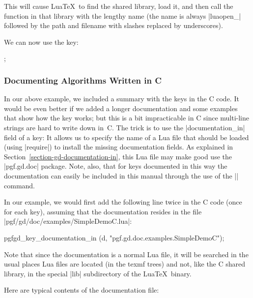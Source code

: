This will cause Lua\TeX\ to find the shared library, load it, and then
call the function in that library with the lengthy name (the name is
always |luaopen_| followed by the path and filename with slashes
replaced by underscores). 

We can now use the key:

\begin{codeexample}[]
\tikz {};
\end{codeexample}

\subsubsection{Documenting Algorithms Written in C}
\label{section-gd-documenting-c-algos}


In our above example, we included a summary with the keys in the C
code. It would be even better if we added a longer documentation and
some examples that show how the key works; but this is a bit
impracticable in C since multi-line strings are hard to write down
in~C. The trick is to use the |documentation_in| field of a key: It
allows us to specify the name of a Lua file that should be loaded
(using |require|) to install the missing documentation fields. As
explained in Section~\ref{section-gd-documentation-in}, this Lua file
may make good use the |pgf.gd.doc| package. Note, also, that for keys
documented in this way the documentation can easily be included in
this manual through the use of the || command.

In our example, we would first add the following line twice in the
C code (once for each key), assuming that the documentation resides in
the file |pgf/gd/doc/examples/SimpleDemoC.lua|:

\begin{codeexample}
  pgfgd_key_documentation_in (d, "pgf.gd.doc.examples.SimpleDemoC");
\end{codeexample}

Note that since the documentation is a normal Lua file, it will be
searched in the usual places Lua files are located (in the texmf
trees) and not, like the C shared library, in the special |lib|
subdirectory of the Lua\TeX\ binary.

Here are typical contents of the documentation file:

